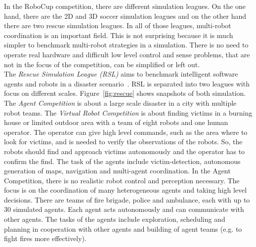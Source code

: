 In the RoboCup competition, there are different simulation leagues. On the one hand, there are the 2D and 3D soccer simulation leagues and on the other hand there are two rescue simulation leagues. In all of those leagues, multi-robot coordination is an important field. This is not surprising because it is much simpler to benchmark multi-robot strategies in a simulation. There is no need to operate real hardware and difficult low level control and sense problems, that are not in the focus of the competition, can be simplified or left out.\\
The \textit{Rescue Simulation League (RSL)} aims to benchmark intelligent software agents and robots in a disaster scenario~\cite{rescue_simulation_league}. RSL is separated into two leagues with focus on different scales. Figure~\ref{fig:rescue} shows snapshots of both simulation. The \textit{Agent Competition} is about a large scale disaster in a city with multiple robot teams. The \textit{Virtual Robot Competition} is about finding victims in a burning house or limited outdoor area with a team of eight robots and one human operator. The operator can give high level commands, such as the area where to look for victims, and is needed to verify the observations of the robots. So, the robots should find and approach victims autonomously and the operator has to confirm the find. The task of the agents include victim-detection, autonomous generation of maps, navigation and multi-agent coordination. In the Agent Competition, there is no realistic robot control and perception necessary. The focus is on the coordination of many heterogeneous agents and taking high level decisions. There are teams of fire brigade, police and ambulance, each with up to 30 simulated agents. Each agent acts autonomously and can communicate with other agents. The tasks of the agents include exploration, scheduling and planning in cooperation with other agents and building of agent teams (e.g. to fight fires more effectively).\\
